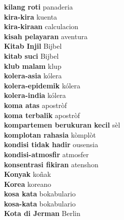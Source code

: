 \textbf{ kilang roti  } panaderia \\
\textbf{ kira-kira  } kuenta \\
\textbf{ kira-kiraan  } calculacion \\
\textbf{ kisah pelayaran  } aventura \\
\textbf{ Kitab Injil  } Bijbel \\
\textbf{ kitab suci  } Bijbel \\
\textbf{ klub malam  } klup \\
\textbf{ kolera-asia  } kólera \\
\textbf{ kolera-epidemik  } kólera \\
\textbf{ kolera-india  } kólera \\
\textbf{ koma atas  } apostròf \\
\textbf{ koma terbalik  } apostròf \\
\textbf{ kompartemen berukuran kecil  } sèl \\
\textbf{ komplotan rahasia  } kòmplòt \\
\textbf{ kondisi tidak hadir  } ousensia \\
\textbf{ kondisi-atmosfir  } atmosfer \\
\textbf{ konsentrasi fikiran  } atenshon \\
\textbf{ Konyak  } koñak \\
\textbf{ Korea  } koreano \\
\textbf{ kosa kata  } bokabulario \\
\textbf{ kosa-kata  } bokabulario \\
\textbf{ Kota di Jerman  } Berlin \\
